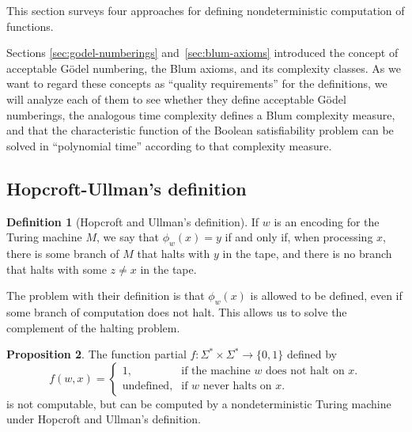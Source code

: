 \documentclass[12pt]{article}
\theoremstyle{definition}
\newtheorem{definition}{Definition}
\newtheorem{proposition}[definition]{Proposition}
\begin{document}
This section surveys four approaches
for defining nondeterministic computation of functions.

Sections \ref{sec:godel-numberings} and~\ref{sec:blum-axioms}
introduced the concept of acceptable Gödel numbering,
the Blum axioms,
and its complexity classes.
As we want to regard these concepts as ``quality requirements''
for the definitions,
we will analyze each of them to see whether they define acceptable Gödel numberings,
the analogous time complexity defines a Blum complexity measure,
and that the characteristic function of the Boolean satisfiability problem
can be solved in ``polynomial time'' according to that complexity measure.

\subsection{Hopcroft-Ullman's definition}

\begin{definition}[Hopcroft and Ullman's definition\footnotemark]
    If $w$ is an encoding for the Turing machine $M$,
    we say that $\phi_w(x) = y$ if and only if,
    when processing $x$,
    there is some branch of $M$ that halts with $y$ in the tape,
    and there is no branch that halts with some $z \neq x$ in the tape.
\end{definition}

The problem with their definition is that $\phi_w(x)$ is allowed to be defined,
even if some branch of computation does not halt.
This allows us to solve the complement of the halting problem.

\begin{proposition}
    The function partial $f: \Sigma^* \times \Sigma^* \to \{0, 1\}$ defined by
    \begin{equation*}
        f(w, x) = \begin{cases}
            1, & \text{if the machine $w$ does not halt on $x$.} \\
            \text{undefined}, &\text{if $w$ never halts on $x$.}
        \end{cases}
    \end{equation*}
    is not computable,
    but can be computed by a nondeterministic Turing machine under
    Hopcroft and Ullman's definition.
\end{proposition}
\end{document}
